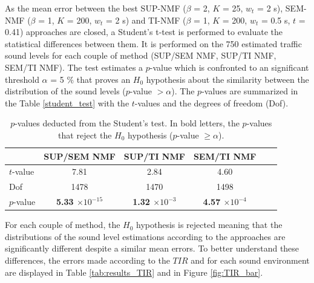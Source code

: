 \documentclass[twocolumn]{svjour3}          %
\begin{document}
As the mean error between the best SUP-NMF ($\beta$ = 2, $K$ = 25, $w_t$ = 2 s), SEM-NMF ($\beta$ = 1, $K$ = 200, $w_t$ = 2 s) and TI-NMF ($\beta$ = 1, $K$ = 200, $w_t$ = 0.5 s, $t$ = 0.41) approaches are closed, a Student's t-test is performed to evaluate the statistical differences between them. It is performed on the 750 estimated traffic sound levels for each couple of method (SUP/SEM NMF, SUP/TI NMF, SEM/TI NMF). The test estimates a $p$-value which is confronted to an significant threshold $\alpha$ = 5 $\%$ that proves an $H_0$ hypothesis about the similarity between the distribution of the sound levels ($p$-value $> \alpha$). The $p$-values are summarized in the Table \ref{student_test} with the $t$-values and the degrees of freedom (Dof).

\begin{table}[t]
\centering
\begin{tabular}{lccccc}
\toprule
  & SUP/SEM NMF & SUP/TI NMF & SEM/TI NMF \\
\midrule
$t$-value & 7.81 & 2.84 & 4.60\\
Dof & 1478 & 1470 & 1498\\
$p$-value & \textbf{5.33 $\times 10^{-15}$} & \textbf{1.32 $\times 10^{-3}$} & \textbf{4.57 $\times 10^{-4}$} \\
\bottomrule
\end{tabular}
\caption{$p$-values deducted from the Student's test. In bold letters, the $p$-values that reject the $H_0$ hypothesis ($p$-value $\geq \alpha$).}
\label{tab:student_test}
\end{table}

For each couple of method, the $H_0$ hypothesis is rejected meaning that the distributions of the sound level estimations according to the approaches are significantly different despite a similar mean errors. 
To better understand these differences, the errors made according to the $TIR$ and for each sound environment are displayed in Table \ref{tab:results_TIR} and in Figure \ref{fig:TIR_bar}.
\end{document}
